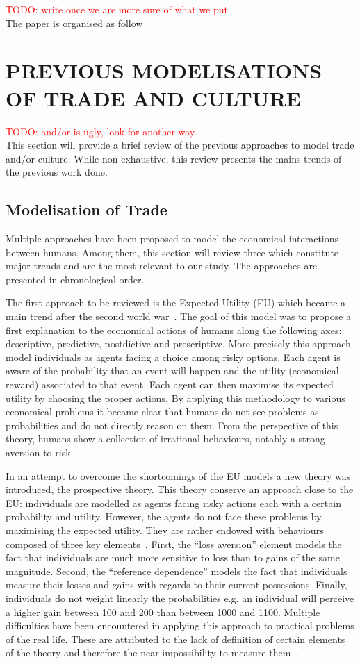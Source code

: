 \documentclass{wscpaperproc}
\newcommand{\memo}[2]{\textcolor{#1}{#2}}
\newcommand{\todo}[1]{\memo{red}{TODO: #1\\}}
\begin{document}
\todo{write once we are more sure of what we put}
The paper is organised as follow

\section{PREVIOUS MODELISATIONS OF TRADE AND CULTURE}

\todo{and/or is ugly, look for another way}
This section will provide a brief review of the previous approaches to model trade and/or culture. While non-exhaustive, this review presents the mains trends of the previous work done.

\subsection{Modelisation of Trade}

Multiple approaches have been proposed to model the economical interactions between humans. Among them, this section will review three which constitute major trends and are the most relevant to our study. The approaches are presented in chronological order.

The first approach to be reviewed is the Expected Utility (EU) which became a main trend after the second world war~\cite{schoemaker_expected_1982}. The goal of this model was to propose a first explanation to the economical actions of humans along the following axes: descriptive, predictive, postdictive and prescriptive. More precisely this approach model individuals as agents facing a choice among risky options. Each agent is aware of the probability that an event will happen and the utility (economical reward) associated to that event. Each agent can then maximise its expected utility by choosing the proper actions. By applying this methodology to various economical problems it became clear that humans do not see problems as probabilities and do not directly reason on them. From the perspective of this theory, humans show a collection of irrational behaviours, notably a strong aversion to risk.

In an attempt to overcome the shortcomings of the EU models a new theory was introduced, the prospective theory. This theory conserve an approach close to the EU: individuals are modelled as agents facing risky actions each with a certain probability and utility. However, the agents do not face these problems by maximising the expected utility. They are rather endowed with behaviours composed of three key elements~\cite{camerer_prospect_2004}. First, the ``loss aversion'' element models the fact that individuals are much more sensitive to loss than to gains of the same magnitude. Second, the ``reference dependence'' models the fact that individuals measure their losses and gains with regards to their current possessions. Finally, individuals do not weight linearly the probabilities e.g. an individual will perceive a higher gain between 100 and 200 than between 1000 and 1100. Multiple difficulties have been encountered in applying this approach to practical problems of the real life. These are attributed to the lack of definition of certain elements of the theory and therefore the near impossibility to measure them~\cite{barberis_thirty_2012}.
\end{document}
